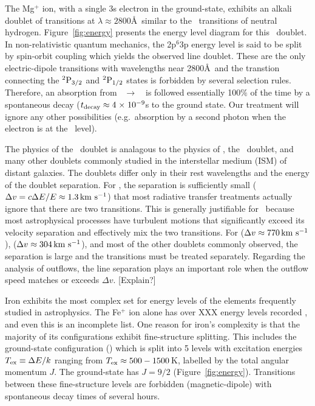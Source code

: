 \documentclass[12pt,preprint]{aastex}
\begin{document}
The Mg$^+$ ion, with a single 3s electron in the ground-state,
exhibits an alkali doublet of transitions at $\lambda \approx
2800$\AA\ similar to the
\lya\ transitions of neutral hydrogen.  Figure~\ref{fig:energy}
presents the energy level diagram for this 
\mgiid\ doublet.  In non-relativistic quantum
mechanics, the 2p$^6$3p energy level is said to be split by spin-orbit
coupling which yields the observed line doublet.  These are the only
 electric-dipole transitions 
with wavelengths near 2800\AA\ and the transtion connecting
the $\rm {}^2P_{3/2}$ and $\rm {}^2P_{1/2}$ states is forbidden by several
selection rules.  Therefore, an absorption from
\maconfig~$\to$~\mbconfig\
is followed essentially 100$\%$ of the time by a spontaneous decay
($t_{\rm decay} \approx 4{\; \times \; 10^{-9}}$s to the
ground state. Our treatment will ignore any other possibilities
(e.g.\ absorption by a second photon when the electron is at the \mbconfig\ level).

The physics of the \mgiid\ doublet
is analagous to the physics of 
\lya, the \naid\ doublet, and many other doublets commonly
studied in the interstellar medium (ISM) of distant galaxies.  The
doublets differ only in 
their rest wavelengths and the energy of the doublet separation. 
For \ion{H}{1} \lya, the
separation is sufficiently small ($\Delta v = c \Delta E / E \approx
1.3 \, {\rm km~s^{-1}}$) that most radiative transfer treatments actually ignore that
there are two transitions.   This is generally justifiable for \lya\ because 
most astrophysical processes have turbulent motions that
significantly exceed its velocity separation and effectively mix the
two transitions.  For \ion{Mg}{2} ($\Delta v \approx 770 \, {\rm km~s^{-1}}$),  
\ion{Na}{1} ($\Delta v \approx 304 \, {\rm km~s^{-1}}$), and most of the other doublets
commonly observed, the separation is large and the transitions
must be treated separately.  Regarding the analysis of outflows, the line
separation plays an important role when the outflow speed matches or
exceeds $\Delta v$.  [Explain?]

Iron exhibits the most complex set for energy levels of the elements
frequently studied in astrophysics.  The Fe$^+$ ion alone has over XXX
energy levels recorded \citep{iron}, and even this is an
incomplete list.  
One reason for iron's complexity is
that the majority of its configurations exhibit fine-structure splitting.
This includes the ground-state configuration (\aconfig) which is split
into 5 levels with 
excitation energies $T_{\rm ex} \equiv \Delta E / k$ ranging from
$T_{\rm ex} \approx 500-1500$\,K, labelled by the total angular momentum
$J$. The ground-state has $J=9/2$ (Figure~\ref{fig:energy}).  
Transitions between these fine-structure levels are 
forbidden (magnetic-dipole) with spontaneous decay times of several hours.  
\end{document}
